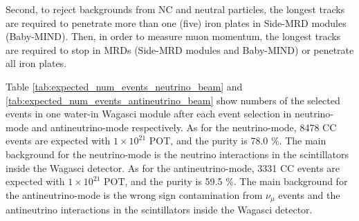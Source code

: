 Second, to reject backgrounds from NC and neutral particles, the longest tracks are required to penetrate more than one (five) iron plates in Side-MRD modules (Baby-MIND). 
Then, in order to measure muon momentum, the longest tracks are required to stop in MRDs (Side-MRD modules and Baby-MIND) or penetrate all iron plates.




Table \ref{tab:expected_num_events_neutrino_beam} and \ref{tab:expected_num_events_antineutrino_beam}  show numbers of the selected events in one water-in Wagasci module after each event selection in neutrino-mode and antineutrino-mode respectively.
As for the neutrino-mode, 8478 CC events are expected with $1 \times 10^{21}$  POT, and the purity is 78.0 \%.
The main background for the neutrino-mode is the neutrino interactions in the scintillators inside the Wagasci detector.
As for the antineutrino-mode, 3331 CC events are expected with $1 \times 10^{21}$  POT, and the purity is 59.5 \%.
The main background for the antineutrino-mode is the wrong sign contamination from $\nu_{\mu}$ events and the antineutrino interactions in the scintillators inside the Wagasci detector.

